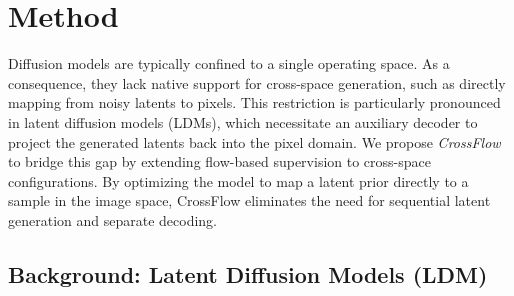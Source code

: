 \section{Method}
Diffusion models are typically confined to a single operating space. As a consequence, they lack native support for cross-space generation, such as directly mapping from noisy latents to pixels. This restriction is particularly pronounced in latent diffusion models (LDMs), which necessitate an auxiliary decoder to project the generated latents back into the pixel domain. We propose \textit{CrossFlow} to bridge this gap by extending flow-based supervision to cross-space configurations. By optimizing the model to map a latent prior directly to a sample in the image space, CrossFlow eliminates the need for sequential latent generation and separate decoding.

\subsection{Background: Latent Diffusion Models (LDM)}

